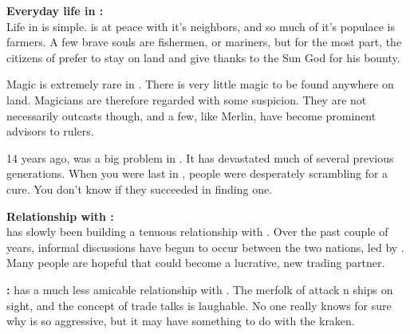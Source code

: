 \documentclass[blue]{NeptuneBall}
\begin{document}
{\bf Everyday life in \pAmerica{}:}\\
Life in \pAmerica{} is simple. \pAmerica{} is at peace with it's neighbors, and so much of it's populace is farmers. A few brave souls are fishermen, or mariners,  but for the most part, the citizens of \pAmerica{} prefer to stay on land and give thanks to the Sun God for his bounty.

Magic is extremely rare in \pAmerica{}. There is very little magic to be found anywhere on land. Magicians are therefore regarded with some suspicion. They are not necessarily outcasts though, and a few, like Merlin, have become prominent advisors to rulers.

14 years ago, \cPolio{} was  a big problem in \pAmerica{}. It has devastated much of several previous generations. When you were last in \pAmerica{}, people were desperately scrambling for a cure. You don't know if they succeeded in finding one.

{\bf Relationship with \pAtlantis{}:}\\
\pAmerica{} has slowly been building a tenuous relationship with \pAtlantis{}. Over the past couple of years, informal discussions  have begun to occur between the two nations, led by \cAriel{\King} \cAriel{}. Many people are hopeful that \pAtlantis{} could become a lucrative, new trading partner.
\item {\bf \pPacifica{}:} \pAmerica{} has a much less amicable relationship with \pPacifica{}. The merfolk of \pPacifica{} attack \pAmerica{}n ships on sight, and the concept of trade talks is laughable. No one really knows for sure why \pPacifica{} is so aggressive, but it may have something to do with the kraken.
\end{document}
